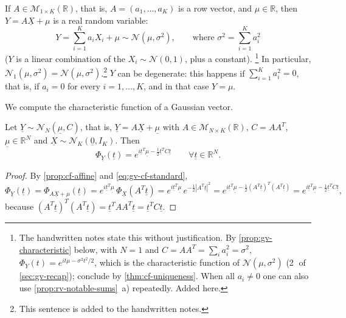 \begin{remark}\label{rem:gv-one-dimensional}
If $A\in\mathcal M_{1\times K}(\mathbb R)$, that is, $A=(a_1,\dots,a_K)$ is a row vector, and
$\mu\in\mathbb R$, then $Y=A\underline X+\mu$ is a real random variable:
\[
  Y=\sum_{i=1}^Ka_iX_i+\mu\sim\mathcal N(\mu,\sigma^2),\qquad\text{where }\sigma^2=\sum_{i=1}^Ka_i^2
\]
($Y$ is a linear combination of the \iid $X_i\sim\mathcal N(0,1)$, plus a constant).%
\footnote{The handwritten notes state this without justification. By
\cref{prop:gv-characteristic} below, with $N=1$ and $C=AA^T=\sum_ia_i^2=\sigma^2$,
$\Phi_Y(t)=e^{it\mu-\sigma^2t^2/2}$, which is the characteristic function of
$\mathcal N(\mu,\sigma^2)$ (\textcircled{\scriptsize 2} of \cref{sec:gv-recap}); conclude by
\cref{thm:cf-uniqueness}. When all $a_i\ne0$ one can also use \cref{prop:rv-notable-sums}~a)
repeatedly. Added here.} In particular, $\mathcal N_1(\mu,\sigma^2)=\mathcal N(\mu,\sigma^2)$.\footnote{This
sentence is added to the handwritten notes.}
$Y$ can be degenerate: this happens if $\sum_{i=1}^Ka_i^2=0$, that is, if $a_i=0$ for every
$i=1,\dots,K$, and in that case $Y=\mu$.
\end{remark}

We compute the characteristic function of a Gaussian vector.

\begin{proposition}\label{prop:gv-characteristic}
Let $\underline Y\sim\mathcal N_N(\underline\mu,C)$, that is, $\underline Y=A\underline X+\underline\mu$
with $A\in\mathcal M_{N\times K}(\mathbb R)$, $C=AA^T$, $\underline\mu\in\mathbb R^N$ and
$\underline X\sim\mathcal N_K(\underline 0,I_K)$. Then
\begin{equation}\label{eq:gv-cf}
  \Phi_{\underline Y}(\underline t)=e^{i\underline t^T\underline\mu-\frac12\underline t^TC\underline t}
  \qquad\forall\underline t\in\mathbb R^N .
\end{equation}
\end{proposition}

\begin{proof}
By \cref{prop:cf-affine} and \eqref{eq:gv-cf-standard},
\[
  \Phi_{\underline Y}(\underline t)=\Phi_{A\underline X+\underline\mu}(\underline t)
  =e^{i\underline t^T\underline\mu}\,\Phi_{\underline X}(A^T\underline t)
  =e^{i\underline t^T\underline\mu}\,e^{-\frac12|A^T\underline t|^2}
  =e^{i\underline t^T\underline\mu-\frac12(A^T\underline t)^T(A^T\underline t)}
  =e^{i\underline t^T\underline\mu-\frac12\underline t^TC\underline t},
\]
because $(A^T\underline t)^T(A^T\underline t)=\underline t^TAA^T\underline t=\underline t^TC\underline t$.
\end{proof}


